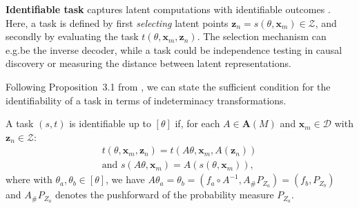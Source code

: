 \textbf{Identifiable task} captures latent computations with identifiable outcomes \citep{xi2023indeterminacy}. Here, a task is defined by first \emph{selecting} latent points $\mathbf{z}_n = s(\theta,\mathbf{x}_m) \in  \mathcal{Z}$, and secondly by evaluating the task $t(\theta,\mathbf{x}_m,\mathbf{z}_n)$. The selection mechanism can e.g.\@ be the inverse decoder, while a task could be independence testing in causal discovery or measuring the distance between latent representations.

Following Proposition~3.1 from \citet{xi2023indeterminacy}, we can state the sufficient condition for the identifiability of a task in terms of indeterminacy transformations.
%
\begin{definition}
\label{def:task_identifiability}
A task $(s, t)$ is identifiable up to $[\theta]$ if, for each $A\in \mathbf{A}(M)$ and  $\mathbf{x}_m \in \mathcal{D}$ with $\mathbf{z}_n \in \mathcal{Z}$:
\begin{equation}
\begin{aligned}
    t(\theta, \mathbf{x}_m ,  \mathbf{z}_n) = t(A\theta, \mathbf{x}_m , A( \mathbf{z}_n)) \\
    \text{and } s(A\theta, \mathbf{x}_m ) = A(s(\theta, \mathbf{x}_m )),
\end{aligned}
\label{eq:task_identifiability}
\end{equation}    
where with $\theta_a, \theta_b \in [\theta]$, we have $A\theta_a=\theta_b=(f_a \circ A^{-1}, A_{\#}P_{Z_a}) = (f_b, P_{Z_b})$ and $A_{\#}P_{Z_a}$ denotes the pushforward of the probability measure $P_{Z_a}$. 
\end{definition}